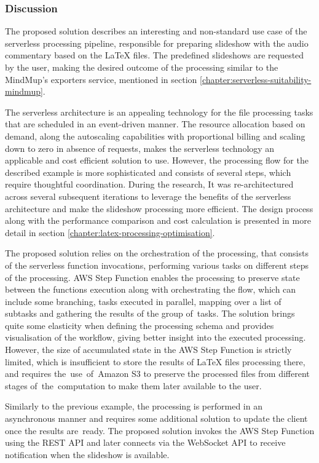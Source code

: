 \subsubsection{Discussion}

The proposed solution describes an interesting and non-standard use case of the serverless processing pipeline, responsible for preparing slideshow with the audio commentary based on the LaTeX files.
The predefined slideshows are requested by the user, making the desired outcome of the processing similar to the MindMup’s exporters service, mentioned in section \ref{chapter:serverless-suitability-mindmup}.

The serverless architecture is an appealing technology for the file processing tasks that are scheduled in an event-driven manner.
The resource allocation based on demand, along the autoscaling capabilities with proportional billing and scaling down to zero in absence of requests, makes the serverless technology an applicable and cost efficient solution to use.
However, the processing flow for the described example is more sophisticated and consists of several steps, which require thoughtful coordination.
During the research, It was re-architectured across several subsequent iterations to leverage the benefits of the serverless architecture and make the slideshow processing more efficient.
The design process along with the performance comparison and cost calculation is presented in more detail in section \ref{chapter:latex-processing-optimisation}.

The proposed solution relies on the orchestration of the processing, that consists of the serverless function invocations, performing various tasks on different steps of the processing.
AWS Step Function enables the processing to preserve state between the functions execution along with orchestrating the flow, which can include some branching, tasks executed in parallel, mapping over a list of subtasks and gathering the results of the group of~tasks.
The solution brings quite some elasticity when defining the processing schema and provides visualisation of the workflow, giving better insight into the executed processing.
However, the size of accumulated state in the AWS Step Function is strictly limited, which is insufficient to store the results of LaTeX files processing there, and requires the~use~of~Amazon S3 to preserve the processed files from different stages of~the~computation to make them later available to the user.

Similarly to the previous example, the processing is performed in an asynchronous manner and requires some additional solution to update the client once the results are~ready. The proposed solution invokes the AWS Step Function using the REST API and later connects via the WebSocket API to receive notification when the slideshow is available.

